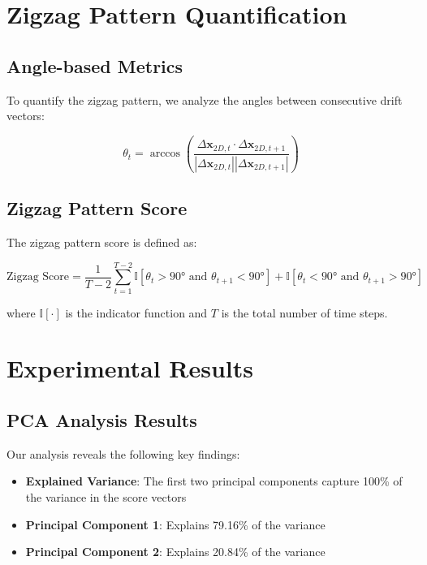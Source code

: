 \documentclass[11pt]{article}
\begin{document}
\section{Zigzag Pattern Quantification}

\subsection{Angle-based Metrics}
To quantify the zigzag pattern, we analyze the angles between consecutive drift vectors:

\begin{equation}
\theta_t = \arccos\left(\frac{\Delta \mathbf{x}_{2D,t} \cdot \Delta \mathbf{x}_{2D,t+1}}{|\Delta \mathbf{x}_{2D,t}| |\Delta \mathbf{x}_{2D,t+1}|}\right)
\end{equation}

\subsection{Zigzag Pattern Score}
The zigzag pattern score is defined as:

\begin{equation}
\text{Zigzag Score} = \frac{1}{T-2} \sum_{t=1}^{T-2} \mathbb{I}[\theta_t > 90° \text{ and } \theta_{t+1} < 90°] + \mathbb{I}[\theta_t < 90° \text{ and } \theta_{t+1} > 90°]
\end{equation}

where $\mathbb{I}[\cdot]$ is the indicator function and $T$ is the total number of time steps.

\section{Experimental Results}

\subsection{PCA Analysis Results}
Our analysis reveals the following key findings:

\begin{itemize}
\item \textbf{Explained Variance}: The first two principal components capture 100\% of the variance in the score vectors
\item \textbf{Principal Component 1}: Explains 79.16\% of the variance
\item \textbf{Principal Component 2}: Explains 20.84\% of the variance
\end{itemize}
\end{document}
